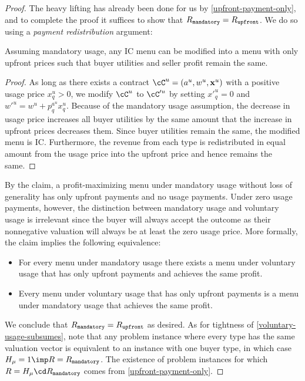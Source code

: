 \begin{proof}
    The heavy lifting has already been done for us by \cref{upfront-payment-only}, and to complete the proof it suffices to show that $R_\mathtt{mandatory} = R_\mathtt{upfront}$. We do so using a \emph{payment redistribution} argument:

    \begin{claim*}
    Assuming mandatory usage, any IC menu can be modified into a menu with only upfront prices such that buyer utilities and seller profit remain the same.
    \end{claim*}

    \begin{proof}
           As long as there exists a contract $\cC^u= (a^u, w^u, \mathbf{x}^u)$ with a positive usage price $x^u_q > 0$, we modify $\cC^u$ to $\cC'^u$ by setting $x'^u_q = 0$ and $w'^u = w^u + p^{a^u}_q x^u_q$. Because of the mandatory usage assumption, the decrease in usage price increases all buyer utilities by the same amount that the increase in upfront prices decreases them. Since buyer utilities remain the same, the modified menu is IC. Furthermore, the revenue from each type is redistributed in equal amount from the usage price into the upfront price and hence remains the same.
    \end{proof}

        By the claim, a profit-maximizing menu under mandatory usage without loss of generality has only upfront payments and no usage payments. Under zero usage payments, however, the distinction between mandatory usage and voluntary usage is irrelevant since the buyer will always accept the outcome as their nonnegative valuation will always be at least the zero usage price. More formally, the claim implies the following equivalence:
        \begin{itemize}
            \item For every menu under mandatory usage there exists a menu under voluntary usage that has only upfront payments and achieves the same profit.
            \item Every menu under voluntary usage that has only upfront payments is a menu under mandatory usage that achieves the same profit.
        \end{itemize}
       We conclude that $R_\mathtt{mandatory} = R_\mathtt{upfront}$ as desired. As for tightness of \cref{voluntary-usage-subsumes}, note that any problem instance where every type has the same valuation vector is equivalent to an instance with one buyer type, in which case $H_\mu = 1\imp R = \Rmandatory$. The existence of problem instances for which $R = H_\mu \cd \Rmandatory$ comes from \cref{upfront-payment-only}. 
\end{proof}

